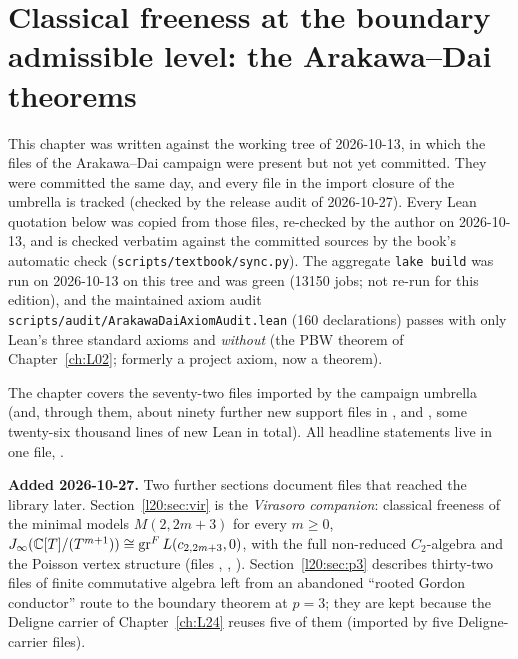 \chapter[Classical freeness at the boundary level: Arakawa--Dai]{Classical freeness at the boundary admissible level: the Arakawa--Dai theorems}\label{ch:L20}
\begingroup\setlength{\emergencystretch}{3em}\sloppy

\providecommand{\ltwentyvac}{\mathbf{1}}
\providecommand{\ltwentysl}{\mathfrak{sl}_2}
\providecommand{\ltwentyR}{R}
\providecommand{\ltwentygr}{\operatorname{gr}^F}
\providecommand{\ltwentyJ}{J_\infty}
\providecommand{\ltwentyQ}{Q}
\providecommand{\ltwentyA}{A_m}
\providecommand{\ltwentyB}{B_m}
\providecommand{\ltwentyCm}{C_m}
\providecommand{\ltwentyqq}[1]{(q)_{#1}}
\providecommand{\ltwentyord}{\operatorname{ord}}

This chapter was written against the working tree of 2026-10-13, in which
the files of the Arakawa--Dai campaign were present but not yet committed. They were committed the same day, and every file in the import closure of the umbrella is tracked (checked by the release audit of
2026-10-27). Every Lean quotation below was copied from those files, re-checked by the author on 2026-10-13, and is
checked verbatim against the committed sources by the book's automatic check (\texttt{scripts/textbook/sync.py}). The aggregate \texttt{lake build} was run on
2026-10-13 on this tree and was green (13150 jobs; not re-run for this edition), and the maintained axiom audit
\texttt{scripts/audit/ArakawaDaiAxiomAudit.lean} (160 declarations) passes with only Lean's three standard
axioms and \emph{without}  (the PBW theorem of Chapter~\ref{ch:L02}; formerly a project axiom, now a theorem).

The chapter covers the seventy-two files imported by the campaign umbrella 
(and, through them, about ninety further new support files in ,
 and , some twenty-six thousand lines of new Lean in total).
All headline statements live in one file, .

\textbf{Added 2026-10-27.} Two further sections document files that reached the library
later. Section~\ref{l20:sec:vir} is the \emph{Virasoro companion}: classical freeness of the minimal models $M(2,2m+3)$ for every
$m\ge0$, $\ltwentyJ(\C[T]/(T^{m+1}))\cong\ltwentygr L(c_{2,2m+3},0)$, with the full non-reduced $C_2$-algebra and the Poisson vertex
structure (files , ,
). Section~\ref{l20:sec:p3} describes thirty-two files of finite commutative algebra
left from an abandoned ``rooted Gordon conductor'' route to the boundary theorem at $p=3$; they are kept because the Deligne carrier of
Chapter~\ref{ch:L24} reuses five of them (imported by five Deligne-carrier files).

